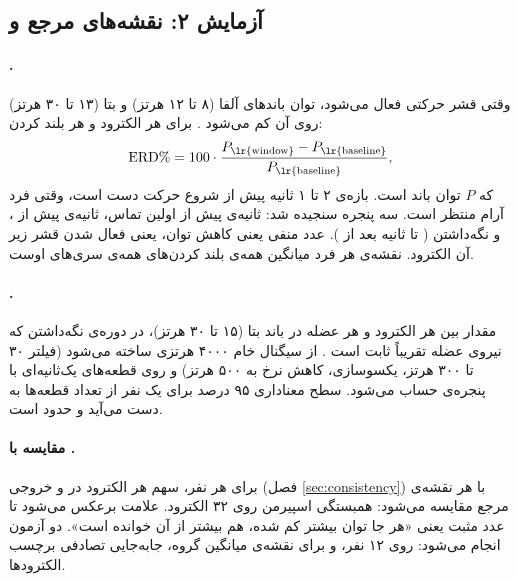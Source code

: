 \FloatBarrier
\subsection{آزمایش ۲: نقشه‌های مرجع  و }
\label{sec:controls-ref}

\paragraph{.} وقتی قشر حرکتی فعال می‌شود، توان باندهای آلفا (۸ تا ۱۲ هرتز) و بتا (۱۳ تا ۳۰ هرتز) روی آن کم می‌شود \cite{pfurtscheller1999}. برای هر الکترود و هر بلند کردن:
\begin{equation}
\mathrm{ERD}\% = 100\cdot\frac{P_{\text{\lr{window}}}-P_{\text{\lr{baseline}}}}{P_{\text{\lr{baseline}}}},
\end{equation}
که $P$ توان باند است.  بازه‌ی ۲ تا ۱ ثانیه پیش از شروع حرکت دست است، وقتی فرد آرام منتظر است. سه پنجره سنجیده شد: ثانیه‌ی پیش از اولین تماس، ثانیه‌ی پیش از ، و نگه‌داشتن ( تا  ثانیه بعد از ). عدد منفی یعنی کاهش توان، یعنی فعال شدن قشر زیر آن الکترود. نقشه‌ی هر فرد میانگین همه‌ی بلند کردن‌های همه‌ی سری‌های اوست.

\paragraph{.} مقدار  بین  هر الکترود و  هر عضله در باند بتا (۱۵ تا ۳۰ هرتز)، در دوره‌ی نگه‌داشتن که نیروی عضله تقریباً ثابت است \cite{kilner2000}.  از سیگنال خام ۴۰۰۰ هرتزی ساخته می‌شود (فیلتر ۳۰ تا ۳۰۰ هرتز، یکسوسازی، کاهش نرخ به ۵۰۰ هرتز) و  روی قطعه‌های یک‌ثانیه‌ای با پنجره‌ی  حساب می‌شود. سطح معناداری ۹۵ درصد برای یک نفر از تعداد قطعه‌ها به دست می‌آید و حدود  است.

\paragraph{مقایسه با .} برای هر نفر، سهم هر الکترود در  و  خروجی  (فصل \ref{sec:consistency}) با هر نقشه‌ی مرجع مقایسه می‌شود: همبستگی اسپیرمن روی ۳۲ الکترود. علامت  برعکس می‌شود تا عدد مثبت یعنی «هر جا توان بیشتر کم شده،  هم بیشتر از آن خوانده است». دو آزمون انجام می‌شود:  روی ۱۲ نفر، و برای نقشه‌ی میانگین گروه، جابه‌جایی تصادفی برچسب الکترودها.

